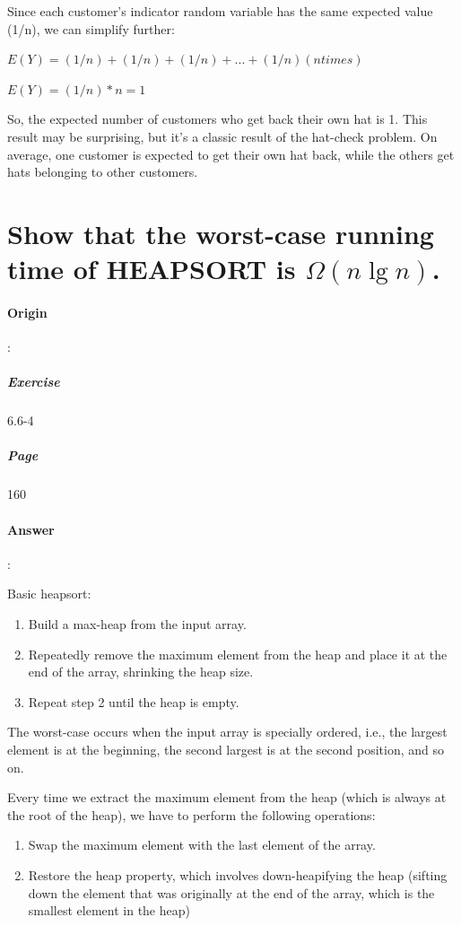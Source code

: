 \documentclass{article}
\begin{document}
  Since each customer's indicator random variable has the same expected value (1/n), we can simplify further:
  
  $E(Y) = (1/n) + (1/n) + (1/n) + ... + (1/n) (n times)$
  
  $E(Y) = (1/n) * n = 1$
  
  So, the expected number of customers who get back their own hat is 1. This result may be surprising, but it's a classic result of the hat-check problem. On average, one customer is expected to get their own hat back, while the others get hats belonging to other customers.
  \section{Show that the worst-case running time of HEAPSORT is $ \Omega (n \lg n)$.}
  \paragraph{Origin}:
    \subparagraph{Exercise}6.6-4
    \subparagraph{Page}160
  \paragraph{Answer}:

  Basic heapsort:

  \begin{enumerate}
    \item Build a max-heap from the input array.
    \item Repeatedly remove the maximum element from the heap and place it at the end of the array, shrinking the heap size.
    \item Repeat step 2 until the heap is empty.
  \end{enumerate}

  The worst-case occurs when the input array is specially ordered, i.e., the largest element is at the beginning, the second largest is at the second position, and so on.

  Every time we extract the maximum element from the heap (which is always at the root of the heap), we have to perform the following operations:

  \begin{enumerate}
    \item Swap the maximum element with the last element of the array.
    \item Restore the heap property, which involves down-heapifying the heap (sifting down the element that was originally at the end of the array, which is the smallest element in the heap)
  \end{enumerate}
\end{document}
